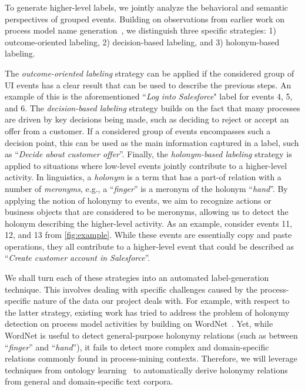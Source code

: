 
 To generate higher-level labels, we jointly analyze the behavioral and semantic perspectives of grouped events. Building on observations from earlier work on process model name generation~\cite{leopold2014simplifying}, we distinguish three specific strategies: 1) outcome-oriented labeling, 2) decision-based labeling, and 3) holonym-based labeling. 

The \textit{outcome-oriented labeling} strategy can be applied if the considered group of UI events has a clear result that can be used to describe the previous steps. An example of this is the aforementioned ``\textit{Log into Salesforce}" label for events 4, 5, and 6.
%
The \textit{decision-based labeling} strategy builds on the fact that many processes are driven by key decisions being made, such as deciding to reject or accept an offer from a customer. If a considered group of events encompasses such a decision point, this can be used as the main information captured in a label, such as ``\textit{Decide about customer offer}''. 
%
Finally, the \textit{holonym-based labeling} strategy is applied to situations where low-level events jointly contribute to a higher-level activity. In linguistics, a \textit{holonym} is a term that has a part-of relation with a number of \textit{meronyms}, e.g., a ``\textit{finger}'' is a meronym of the holonym ``\textit{hand}''.
By applying the notion of holonymy to events, we aim to recognize actions or business objects that are considered to be meronyms, allowing us to detect the holonym describing the higher-level activity. As an example, consider events 11, 12, and 13 from \autoref{fig:example}. While these events are essentially copy and paste operations, they all contribute to a higher-level event that could be described as ``\textit{Create customer account in Salesforce}''. 

We shall turn each of these strategies into an automated label-generation technique. This involves dealing with specific challenges caused by the process-specific nature of the data our project deals with. For example, with respect to the latter strategy, existing work has tried to address the problem of holonymy detection on process model activities by building on WordNet~\cite{leopold2014simplifying}. Yet, while WordNet is useful to detect general-purpose holonymy relations (such as between ``\textit{finger}'' and ``\textit{hand}''), it fails to detect more complex and domain-specific relations commonly found in process-mining contexts. Therefore, we will leverage techniques from ontology learning~\cite{al2020automatic,wong2012ontology} to automatically derive holonymy relations from general and domain-specific text corpora.    


